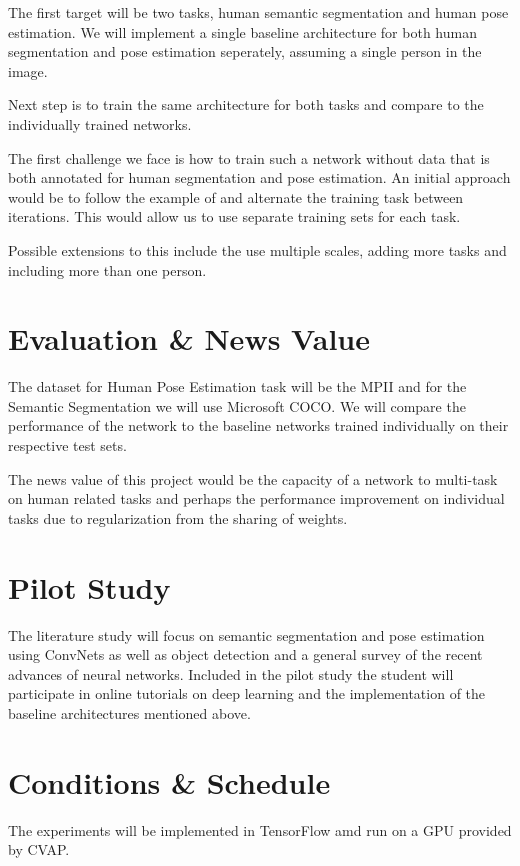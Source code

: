 \documentclass[a4paper,10pt]{article}
\begin{document}
The first target will be two tasks, human semantic segmentation and human pose estimation.  We will implement a  single baseline architecture for both human segmentation and pose estimation seperately, assuming a single person in the image. 

Next step is to train the same architecture for both tasks and compare to the individually trained networks.  

The first challenge we face is how to train such a network without data that is both annotated for human segmentation and pose estimation.  An initial approach would be to follow the example of \cite{multitask} and alternate the training task between iterations.  This would allow us to use separate training sets for each task.

Possible extensions to this include the use multiple scales, adding more tasks and including more than one person.


\section{Evaluation \& News Value}
The dataset for Human Pose Estimation task will be the MPII\cite{Andriluka} and for the Semantic Segmentation we will use Microsoft COCO\cite{Lin2014}.  We will compare the performance of the network to the baseline networks trained individually on their respective test sets.

The news value of this project would be the capacity of a network to multi-task on human related tasks and perhaps the performance improvement on individual tasks due to regularization from the sharing of weights.

\section{Pilot Study}
The literature study will focus on semantic segmentation and pose estimation using ConvNets as well as object detection and a general survey of the recent advances of neural networks.  Included in the pilot study the student will participate in online tutorials on deep learning and the implementation of the baseline architectures mentioned above.


\section{Conditions \& Schedule}
The experiments will be implemented in TensorFlow\cite{Abadi2015} amd run on a GPU provided by CVAP.


\end{document}
